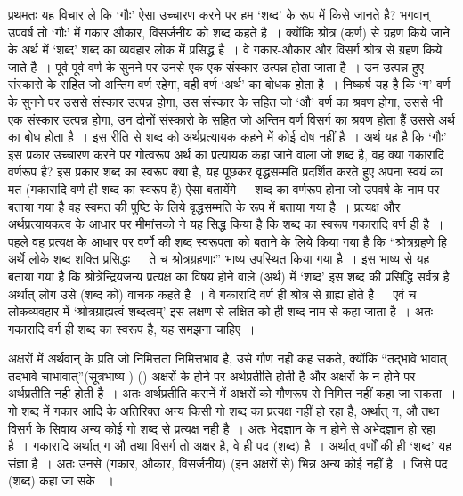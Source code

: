 प्रथमतः यह विचार ले कि ‘गौः' ऐसा उच्चारण करने पर हम ‘शब्द' के रूप में किसे जानते है? भगवान् उपवर्ष तो ‘गौः' में गकार औकार, विसर्जनीय को शब्द कहते है~। क्योंकि श्रोत्र (कर्ण) से ग्रहण किये जाने के अर्थ में ‘शब्द' शब्द का व्यवहार लोक में प्रसिद्ध है~। वे गकार-औकार और विसर्ग श्रोत्र से ग्रहण किये जाते है~। पूर्व-पूर्व वर्ण के सुनने पर उनसे एक-एक संस्कार उत्पन्न होता जाता है~। उन उत्पन्न हुए संस्कारो के सहित जो अन्तिम वर्ण रहेगा, वही वर्ण ‘अर्थ' का बोधक होता है~। निष्कर्ष यह है कि ‘ग' वर्ण के सुनने पर उससे संस्कार उत्पन्न होगा, उस संस्कार के सहित जो ‘औ' वर्ण का श्रवण होगा, उससे भी एक संस्कार उत्पन्न होगा, उन दोनों संस्कारो के सहित जो अन्तिम वर्ण विसर्ग का श्रवण होता हैं उससे अर्थ का बोध होता है~। इस रीति से शब्द को अर्थप्रत्यायक कहने में कोई दोष नहीं है~। अर्थ यह है कि ‘गौः' इस प्रकार उच्चारण करने पर गोत्वरूप अर्थ का प्रत्यायक कहा जाने वाला जो शब्द है, वह क्या गकारादि वर्णरूप है? इस प्रकार शब्द का स्वरूप क्या है, यह पूछकर वृद्धसम्मति प्रदर्शित करते हुए अपना स्वयं का मत (गकारादि वर्ण ही शब्द का स्वरूप है) ऐसा बतायेंगे~। शब्द का वर्णरूप होना जो उपवर्ष के नाम पर बताया गया है वह स्वमत की पुष्टि के लिये वृद्धसम्मति के रूप में बताया गया है~। प्रत्यक्ष और अर्थप्रत्यायकत्व के आधार पर मीमांसको ने यह सिद्ध किया है कि शब्द का स्वरूप गकारादि वर्ण ही है~। पहले वह प्रत्यक्ष के आधार पर वर्णो की शब्द स्वरूपता को बताने के लिये किया गया है कि “श्रोत्रग्रहणे हि अर्थे लोके शब्द शक्ति प्रसिद्धः~। ते च श्रोत्रग्रहणाः” भाष्य उपस्थित किया गया है~। इस भाष्य से यह बताया गया हैै कि श्रोत्रेन्द्रियजन्य प्रत्यक्ष का विषय होने वाले (अर्थ) में ‘शब्द' इस शब्द की प्रसिद्धि सर्वत्र है अर्थात् लोग उसे (शब्द को) वाचक कहते है~। वे गकारादि वर्ण ही श्रोत्र से ग्राह्य होते है~। एवं च लोकव्यवहार में ‘श्रोत्रग्राह्यत्वं शब्दत्वम्' इस लक्षण से लक्षित को ही शब्द नाम से कहा जाता है~। अतः गकारादि वर्ग ही शब्द का स्वरूप है, यह समझना चाहिए~। 

अक्षरों में अर्थवान् के प्रति जो निमित्तता निमित्तभाव है, उसे गौण नही कह सकते, क्योंकि “तद्भावे भावात् तदभावे चाभावात्”(सूत्रभाष्य ) () अक्षरों के होने पर अर्थप्रतीति होती है और अक्षरों के न होने पर अर्थप्रतीति नही होती है~। अतः अर्थप्रतीति करानें में अक्षरों को गौणरूप से निमित्त नहीं कहा जा सकता~। गो शब्द में गकार आदि के अतिरिक्त अन्य किसी गो शब्द का प्रत्यक्ष नहीं हो रहा है, अर्थात् ग, औ तथा विसर्ग के सिवाय अन्य कोई गो शब्द से प्रत्यक्ष नही है~। अतः भेदज्ञान के न होने से अभेदज्ञान हो रहा है~। गकारादि अर्थात् ग औ तथा विसर्ग तो अक्षर है, वे ही पद (शब्द) है~। अर्थात् वर्णों की ही ‘शब्द' यह संज्ञा है~। अतः उनसे (गकार, औकार, विसर्जनीय) (इन अक्षरों से) भिन्न अन्य कोई नहीं है~। जिसे पद (शब्द) कहा जा सके ~। 

